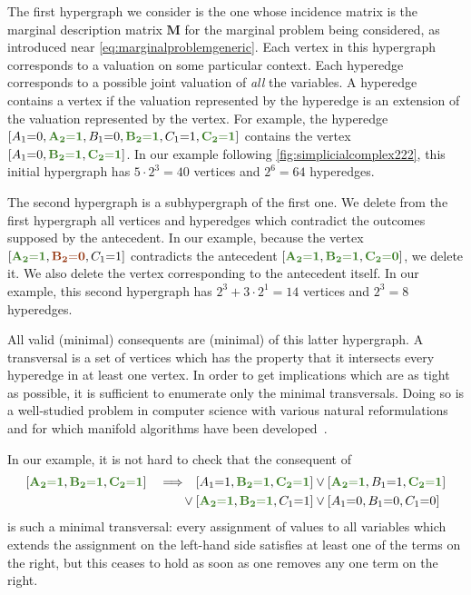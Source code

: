 \documentclass[aps,english,10pt,superscriptaddress,onecolumn,twoside,longbibliography,pra,floatfix,fleqn,nofootinbib]{revtex4-1}
\newcommand*{\mred}[1]{{\color{RawSienna}{\mathbf{#1}}}}
\newcommand*{\mgreen}[1]{{\color{OliveGreen}{\mathbf{#1}}}}
\newcommand*{\tblue}[1]{{\color{medblue}{\textbf{#1}}}}
\theoremstyle{definition}
\newcounter{example}[section]
\newcommand{\eql}{\mathord{=}}
\DeclarePairedDelimiter{\bracks}{\lbrack}{\rbrack}
\begin{document}
The first hypergraph we consider is the one whose incidence matrix is the marginal description matrix $\bm{M}$ for the marginal problem being considered, as introduced near \cref{eq:marginalproblemgeneric}. 
Each vertex in this hypergraph corresponds to a valuation on some particular context. Each hyperedge corresponds to a possible joint valuation of \emph{all} the variables. A hyperedge contains a vertex if the valuation represented by the hyperedge is an extension of the valuation represented by the vertex. For example, the hyperedge $\bracks{A_1 \eql 0, \mgreen{A_2 \eql 1}, B_1 \eql 0, \mgreen{B_2 \eql 1}, C_1 \eql 1, \mgreen{C_2 \eql 1}}$ contains the vertex $\bracks{A_1 \eql 0,  \mgreen{B_2 \eql 1}, \mgreen{C_2 \eql 1}}$. In our example following \cref{fig:simplicialcomplex222}, this initial hypergraph has $5\cdot 2^3 = 40$ vertices and $2^6 = 64$ hyperedges. 

The second hypergraph is a subhypergraph of the first one. We delete from the first hypergraph all vertices and hyperedges which contradict the outcomes supposed by the antecedent. In our example, because the vertex $\bracks{\mgreen{A_2 \eql 1}, \mred{B_2 \eql 0}, C_1 \eql 1}$ contradicts the antecedent $\bracks{\mgreen{A_2 \eql 1}, \mgreen{B_2 \eql 1}, \mgreen{C_2 \eql 0}}$, we delete it. We also delete the vertex corresponding to the antecedent itself. In our example, this second hypergraph has $2^3 + 3\cdot 2^1 = 14$ vertices and $2^3 = 8$ hyperedges.

All valid (minimal) consequents are (minimal) \tblue{transversals} of this latter hypergraph. A transversal is a set of vertices which has the property that it intersects every hyperedge in at least one vertex. In order to get implications which are as tight as possible, it is sufficient to enumerate only the minimal transversals. Doing so is a well-studied problem in computer science with various natural reformulations and for which manifold algorithms have been developed~\cite{eiter_dualization_2008}.

In our example, it is not hard to check that the consequent of
\begin{align}\begin{split}\label{eq:F3implicationform}
	\bracks{\mgreen{A_2 \eql 1}, \mgreen{B_2 \eql 1}, \mgreen{C_2 \eql 1}}  \quad\Longrightarrow\quad & \bracks{A_1 \eql 1, \mgreen{B_2 \eql 1}, \mgreen{C_2 \eql 1}} \lor \bracks{\mgreen{A_2 \eql 1}, B_1 \eql 1, \mgreen{C_2 \eql 1}} \\
	 \lor\: & \bracks{\mgreen{A_2 \eql 1}, \mgreen{B_2 \eql 1}, C_1 \eql 1} \lor \bracks{A_1 \eql 0, B_1 \eql 0, C_1 \eql 0}
\end{split}\end{align}
is such a minimal transversal: every assignment of values to all variables which extends the assignment on the left-hand side satisfies at least one of the terms on the right, but this ceases to hold as soon as one removes any one term on the right. 
\end{document}
